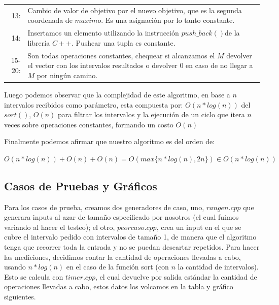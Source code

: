 \documentclass[a4paper, 10pt]{article}
\begin{document}
\begin{tabular}{rp{15.8cm}}
13:& Cambio de valor de objetivo por el nuevo objetivo, que es la segunda coordenada de $maximo$. Es una asignación por lo tanto constante.\\
14:& Insertamos un elemento utilizando la instrucción $push\_back()$\footnotemark de la librería $C++$. Pushear una tupla es constante.\\
15-20:& Son todas operaciones constantes, chequear si alcanzamos el $M$ devolver el vector con los intervalos resultados o devolver $0$ en caso de no llegar a $M$ por ningún camino.\\
\end{tabular}


Luego podemos observar que la complejidad de este algoritmo, en base a $n$ intervalos recibidos como parámetro, esta compuesta por: $O(n * log(n))$ del $sort()$, $O(n)$ para filtrar los intervalos y la ejecución de un ciclo que itera $n$ veces sobre operaciones constantes, formando un costo $O(n)$

Finalmente podemos afirmar que nuestro algoritmo es del orden de:
\begin{center}
$O(n * log(n)) + O(n) + O(n) = O(max\{n * log(n), 2n\}) \in O(n * log(n))$
\end{center}



\subsection{Casos de Pruebas y Gráficos}

Para los casos de prueba, creamos dos generadores de caso, uno, $rangen.cpp$ que generara inputs al azar de tamaño especificado por nosotros (el cual fuimos variando al hacer el testeo); el otro, $peorcaso.cpp$, crea un input en el que se cubre el intervalo pedido con intervalos de tamaño 1, de manera que el algoritmo tenga que recorrer toda la entrada y no se puedan descartar repetidos. Para hacer las mediciones, decidimos contar la cantidad de operaciones llevadas a cabo, usando $n* log (n)$ en el caso de la función sort (con $n$ la cantidad de intervalos). Esto se calcula con $timer.cpp$, el cual devuelve por salida estándar la cantidad de operaciones llevadas a cabo, estos datos los volcamos en la tabla y gráfico siguientes.
\end{document}
